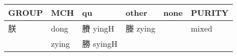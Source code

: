 \documentclass[14pt,a4paper]{scrartcl}
\begin{document}
\begin{longtable}[c]{@{}llllll@{}}
\toprule
\begin{minipage}[b]{0.14\columnwidth}\raggedright\strut
GROUP
\strut\end{minipage} &
\begin{minipage}[b]{0.14\columnwidth}\raggedright\strut
MCH
\strut\end{minipage} &
\begin{minipage}[b]{0.14\columnwidth}\raggedright\strut
qu
\strut\end{minipage} &
\begin{minipage}[b]{0.14\columnwidth}\raggedright\strut
other
\strut\end{minipage} &
\begin{minipage}[b]{0.14\columnwidth}\raggedright\strut
none
\strut\end{minipage} &
\begin{minipage}[b]{0.14\columnwidth}\raggedright\strut
PURITY
\strut\end{minipage}\tabularnewline
\midrule
\endhead
\begin{minipage}[t]{0.14\columnwidth}\raggedright\strut
朕
\strut\end{minipage} &
\begin{minipage}[t]{0.14\columnwidth}\raggedright\strut
dong
\strut\end{minipage} &
\begin{minipage}[t]{0.14\columnwidth}\raggedright\strut
賸 yingH
\strut\end{minipage} &
\begin{minipage}[t]{0.14\columnwidth}\raggedright\strut
塍 zying
\strut\end{minipage} &
\begin{minipage}[t]{0.14\columnwidth}\raggedright\strut
\strut\end{minipage} &
\begin{minipage}[t]{0.14\columnwidth}\raggedright\strut
mixed
\strut\end{minipage}\tabularnewline
\begin{minipage}[t]{0.14\columnwidth}\raggedright\strut
𦨶
\strut\end{minipage} &
\begin{minipage}[t]{0.14\columnwidth}\raggedright\strut
zying
\strut\end{minipage} &
\begin{minipage}[t]{0.14\columnwidth}\raggedright\strut
勝 syingH
\strut\end{minipage} &
\begin{minipage}[t]{0.14\columnwidth}\raggedright\strut

\end{minipage}
\end{longtable}
\end{document}
